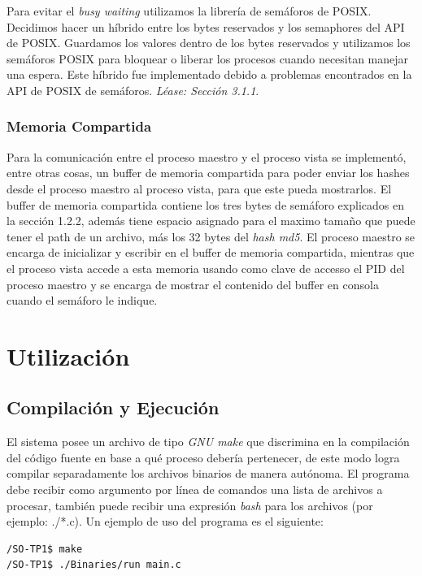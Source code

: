 \documentclass[10pt,a4paper]{report}
\begin{document}
Para evitar el \textit{busy waiting} utilizamos la librería de semáforos de POSIX. Decidimos hacer un híbrido entre los bytes reservados y los semaphores del API de POSIX. Guardamos los valores dentro de los bytes reservados y utilizamos los semáforos POSIX para bloquear o liberar los procesos cuando necesitan manejar una espera. Este híbrido fue implementado debido a problemas encontrados en la API de POSIX de semáforos. \textit{Léase: Sección 3.1.1}.
\subsection{Memoria Compartida}
Para la comunicación entre el proceso maestro y el proceso vista se implementó, entre otras cosas, un buffer de memoria compartida para poder enviar los hashes desde el proceso maestro al proceso vista, para que este pueda mostrarlos.
El buffer de memoria compartida contiene los tres bytes de semáforo explicados en la sección 1.2.2, además tiene espacio asignado para el maximo tamaño que puede tener el path de un archivo, más los 32 bytes del \textit{hash md5}.
El proceso maestro se encarga de inicializar y escribir en el buffer de memoria compartida, mientras que el proceso vista accede a esta memoria usando como clave de accesso el PID del proceso maestro y se encarga de mostrar el contenido del buffer en consola cuando el semáforo le indique.


\chapter{Utilización}
\section{Compilación y Ejecución}
El sistema posee un archivo de tipo \textit{GNU make} que discrimina en la compilación del código fuente en base a qué proceso debería pertenecer, de este modo logra compilar separadamente los archivos binarios de manera autónoma. El programa debe recibir como argumento por línea de comandos una lista de archivos a procesar, también puede recibir una expresión \textit{bash} para los archivos (por ejemplo: ./*.c). Un ejemplo de uso del programa es el siguiente:
\begin{lstlisting}
/SO-TP1$ make
/SO-TP1$ ./Binaries/run main.c
\end{lstlisting}
\end{document}
